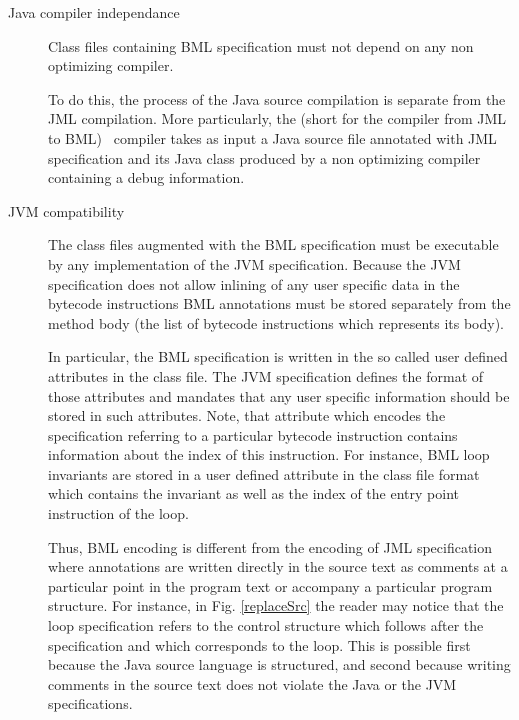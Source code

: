 \begin{description}

\item [Java compiler independance ] 
      Class files containing BML specification must not depend on 
      any non optimizing compiler. 
    
      To do this, the process of the Java source compilation is separate from the JML compilation. 
      More particularly, the \JMLtoBML (short for the compiler from JML to BML) \ compiler  takes as input a Java source file annotated with JML
      specification and its Java class produced by a non optimizing compiler containing a
      debug information.%
      

\item [JVM compatibility]
            The class files augmented with the BML specification must be executable by any
	    implementation of the JVM specification.
	     Because the JVM specification does not allow inlining of any user specific data in the bytecode instructions 
	    BML annotations must be stored separately from the method body (the list of bytecode instructions which represents its body).
	  
	    
	    In particular, the BML specification is written in the so
	    called user defined attributes in the class file.
	    The JVM specification defines the format of those attributes and mandates that any
	    user specific information should be stored in such attributes. 
	    Note, that attribute which encodes the specification  referring to a particular bytecode instruction contains
	    information about the index of this instruction. For instance,  BML loop invariants
	    are stored in a user defined attribute in the class file format which  contains the invariant
	    as well as the index of the entry point instruction of the loop.
	    
	    Thus, BML encoding is different from the encoding of   JML specification where
	    annotations are written directly in the source text as comments
	    at a particular point in the program text or accompany a particular program structure. 
	    For instance, in Fig. \ref{replaceSrc} the
	    reader may notice that the loop specification
	    refers to the control structure which follows after the specification and which corresponds to the loop.
	    This is possible first because
	    the Java source language is structured, and second because writing comments in the source text
	    does not violate the Java or the JVM  specifications. 
	  


\end{description}
